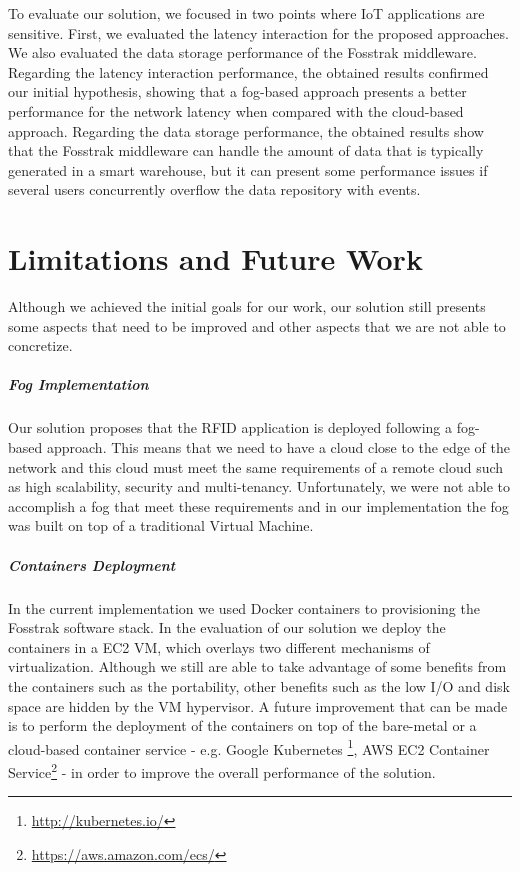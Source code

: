 To evaluate our solution, we focused in two points where \gls{IoT} applications are sensitive. First,
we evaluated the latency interaction for the proposed approaches. We also evaluated the data storage
performance of the Fosstrak middleware. Regarding the latency interaction performance, the obtained
results confirmed our initial hypothesis, showing that a fog-based approach presents a better
performance for the network latency when compared with the cloud-based approach. Regarding the data
storage performance, the obtained results show that the Fosstrak middleware can handle the amount
of data that is typically generated in a smart warehouse, but it can present some performance issues
if several users concurrently overflow the data repository with events.

\section{Limitations and Future Work}
\label{sec:limitations_and_future_work}
Although we achieved the initial goals for our work, our solution still presents some aspects that
need to be improved and other aspects that we are not able to concretize.

\subparagraph{Fog Implementation}
\label{subp:fog_impl}
Our solution proposes that the \gls{RFID} application is deployed following a fog-based approach.
This means that we need to have a cloud close to the edge of the network and this cloud must meet
the same requirements of a remote cloud such as high scalability, security and multi-tenancy.
Unfortunately, we were not able to accomplish a fog that meet these requirements and in our implementation
the fog was built on top of a traditional Virtual Machine.\\

\subparagraph{Containers Deployment}
\label{subp:containers_impl}
In the current implementation we used Docker containers to provisioning the Fosstrak software stack.
In the evaluation of our solution we deploy the containers in a \gls{EC2} \gls{VM}, which overlays two
different mechanisms of virtualization. Although we still are able to take advantage of some benefits
from the containers such as the portability, other benefits such as the low I/O and disk space are
hidden by the \gls{VM} hypervisor. A future improvement that can be made is to perform the deployment
of the containers on top of the bare-metal or a cloud-based container service - e.g. Google Kubernetes
\footnote{\url{http://kubernetes.io/}}, \gls{AWS} \gls{EC2} Container Service\footnote{\url{https://aws.amazon.com/ecs/}} -
in order to improve the overall performance of the solution.

